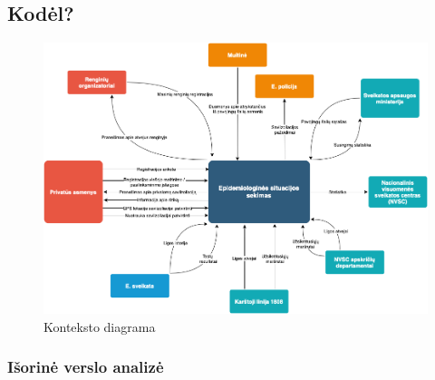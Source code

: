 \documentclass{VUMIFPSkursinis}
\begin{document}
\subsection{Kodėl?}

\begin{figure}[H]
    \centering
    \includegraphics[scale=0.5]{img/context_diagram.png}
    \caption{Konteksto diagrama}
    \label{img:context_diagram}
\end{figure}

\subsubsection{Išorinė verslo analizė}
\end{document}
